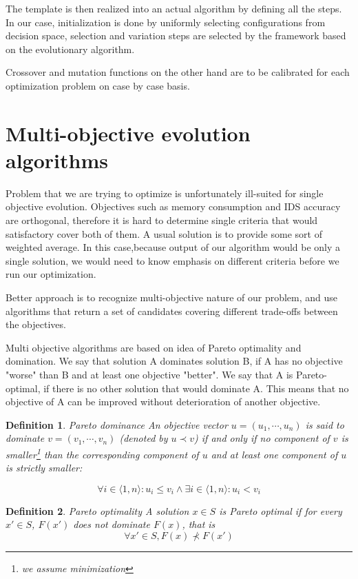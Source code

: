 \documentclass[12pt,oneside]{fithesis2}
\newtheorem{defn}{Definition}
\begin{document}
The template is then realized into an actual algorithm by defining all the steps. In our case, initialization is done by uniformly selecting configurations from decision space, selection and variation steps are selected by the framework based on the evolutionary algorithm. 

Crossover and mutation functions on the other hand are to be calibrated for each optimization problem on case by case basis.

\section{Multi-objective evolution algorithms}
Problem that we are trying to optimize is unfortunately ill-suited for single objective evolution. Objectives such as memory consumption and IDS accuracy are orthogonal, therefore it is hard to determine single criteria that would satisfactory cover both of them. A usual solution is to provide some sort of weighted average. In this case,because output of our algorithm would be only a single solution, we would need to know emphasis on different criteria before we run our optimization. 

Better approach is to recognize multi-objective nature of our problem, and use algorithms that return a set of candidates covering different trade-offs between the objectives. 

Multi objective algorithms are based on idea of Pareto optimality and domination. We say that solution A dominates solution B, if A has no objective "worse" than B and at least one objective "better". We say that A is Pareto-optimal, if there is no other solution that would dominate A. This means that no objective of A can be improved without deterioration of another objective. 

\begin{defn}{Pareto dominance}
An objective vector $u = (u_1,\cdots,u_n)$ is said to dominate $v = (v_1,\cdots,v_n)$ (denoted by $u \prec v$) if and only if no component of $v$ is smaller\footnote{we assume minimization} than the corresponding component of $u$ and at least one component of $u$ is strictly smaller:

$$ \forall i \in \langle 1,n\rangle: u_i \leq v_i \land \exists i \in \langle 1,n\rangle: u_i < v_i $$
\end{defn}

\begin{defn}{Pareto optimality}
A solution $x \in S$ is Pareto optimal if for every $x' \in S$, $F(x')$ does not dominate $F(x)$, that is $$ \forall x' \in S, F(x) \not \prec F(x') $$
\end{defn}
\end{document}

